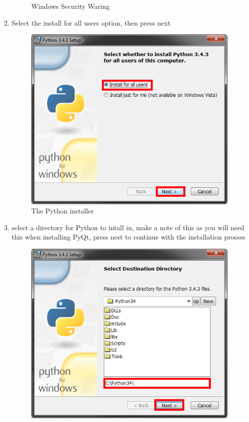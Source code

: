\begin{enumerate}
\begin{figure}[H]
\caption{Windows Security Waring} \label{fig:PyISP3}
\end{figure}
\item Select the install for all users option, then press next
\begin{figure}[H]
\includegraphics[width=\textwidth]{./Manual/PythonInstall/Part4.png}
\caption{The Python installer} \label{fig:PyISP4}
\end{figure}
\item select a directory for Python to intall in, make a note of this as you will need this when installing PyQt, press nest to continue with the  installation prosses
\begin{figure}[H]
\includegraphics[width=\textwidth]{./Manual/PythonInstall/Part5.png}

\end{figure}
\end{enumerate}
